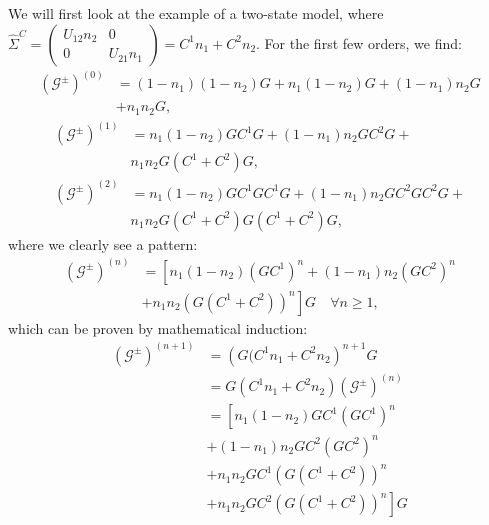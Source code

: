 \documentclass{article}
\begin{document}
\begin{multicols}{2}
        
        We will first look at the example of a two-state model, where $\hat{\Sigma}^C = \begin{pmatrix} U_{12}n_2 & 0 \\ 0 & U_{21} n_1\end{pmatrix}=C^1 n_1 + C^2 n_2$. For the first few orders, we find:
        \begin{align*}
            \left(\mathscr{G}^\pm\right)^{(0)} &= (1-n_1)(1-n_2)G + n_1(1-n_2)G + (1-n_1) n_2 G \\&+ n_1 n_2 G,  
        \end{align*}
        \begin{align*}
            \left(\mathscr{G}^\pm\right)^{(1)} &=  n_1(1-n_2)GC^1 G + (1-n_1) n_2 G C^2 G +\\& n_1 n_2 G \left(C^1+C^2\right) G, \\
            \left(\mathscr{G}^\pm\right)^{(2)} &=  n_1(1-n_2)GC^1 GC^1 G + (1-n_1) n_2 G C^2 GC^2 G +\\& n_1 n_2 G \left(C^1+C^2\right) G\left(C^1+C^2\right) G, 
        \end{align*}
        where we clearly see a pattern:
        \begin{align*}
            \left(\mathscr{G}^\pm\right)^{(n)} &= \left[n_1 (1-n_2) \left(G C^1\right)^n + (1-n_1) n_2 \left(GC^2\right)^n\right. \\ & \left. + n_1 n_2 \left(G (C^1 +C^2)\right)^n\right] G \quad \forall n \geq 1,
        \end{align*}
        which can be proven by mathematical induction:
        \begin{align*}
        \left(\mathscr{G}^\pm\right)^{(n+1)} &= \left( G (C^1 n_1 + C^2 n_2\right)^{n+1} G \\
        &= G (C^1 n_1 + C^2 n_2 )\left(\mathscr{G}^\pm\right)^{(n)} \\
        &= \left[ n_1 (1-n_2) G C^1 (GC^1)^n \right. \\ &+ (1-n_1) n_2 G C^2(GC^2)^n \\ &+ n_1 n_2 GC^1 (G (C^1+C^2))^n \\ &\left.+ n_1 n_2 GC^2 (G (C^1+C^2))^n \right] G
        \end{align*}
        

\end{multicols}
\end{document}
